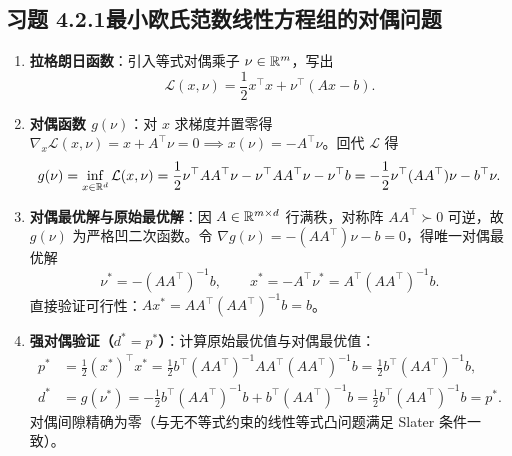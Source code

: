 \subsection*{习题 4.2.1\quad 最小欧氏范数线性方程组的对偶问题}
\begin{enumerate}[label=(\arabic*), leftmargin=1.8em]
  \item \textbf{拉格朗日函数}：引入等式对偶乘子 $\nu \in \mathbb{R}^m$，写出
  \[
    \mathcal{L}(x, \nu) = \frac{1}{2}x^\top x + \nu^\top (Ax - b).
  \]
  \item \textbf{对偶函数 $g(\nu)$}：对 $x$ 求梯度并置零得 $\nabla_x \mathcal{L}(x, \nu) = x + A^\top \nu = 0 \implies x(\nu) = -A^\top \nu$。回代 $\mathcal{L}$ 得
  \[
    g(\nu) = \inf_{x\in\mathbb{R}^d} \mathcal{L}(x, \nu)
    = \frac{1}{2}\nu^\top A A^\top \nu - \nu^\top A A^\top \nu - \nu^\top b
    = -\frac{1}{2}\nu^\top (A A^\top)\nu - b^\top \nu.
  \]
  \item \textbf{对偶最优解与原始最优解}：因 $A \in \mathbb{R}^{m\times d}$ 行满秩，对称阵 $A A^\top \succ 0$ 可逆，故 $g(\nu)$ 为严格凹二次函数。令 $\nabla g(\nu) = -(AA^\top)\nu - b = 0$，得唯一对偶最优解
  \[
    \nu^* = -(A A^\top)^{-1} b, \qquad
    x^* = -A^\top \nu^* = A^\top (A A^\top)^{-1} b.
  \]
  直接验证可行性：$A x^* = A A^\top (A A^\top)^{-1} b = b$。
  \item \textbf{强对偶验证（$d^* = p^*$）}：计算原始最优值与对偶最优值：
  \begin{align*}
    p^* &= \frac{1}{2}(x^*)^\top x^* = \frac{1}{2} b^\top (AA^\top)^{-1} A A^\top (AA^\top)^{-1} b = \frac{1}{2} b^\top (A A^\top)^{-1} b, \\
    d^* &= g(\nu^*) = -\frac{1}{2} b^\top (AA^\top)^{-1} b + b^\top (AA^\top)^{-1} b = \frac{1}{2} b^\top (A A^\top)^{-1} b = p^*.
  \end{align*}
  对偶间隙精确为零（与无不等式约束的线性等式凸问题满足 Slater 条件一致）。
\end{enumerate}

